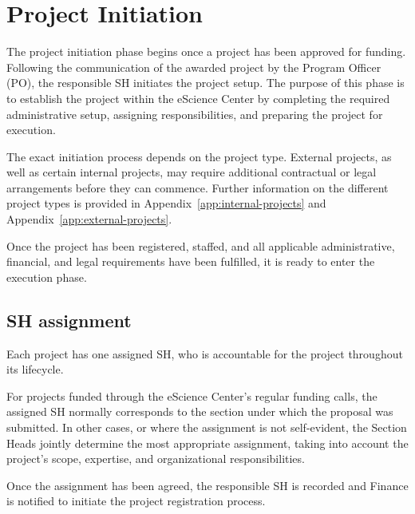 \section{Project Initiation}
\label{sec:init}
The project initiation phase begins once a project has been approved for funding. Following the communication of the 
awarded project by the Program Officer (PO), the responsible SH initiates the project setup. The purpose of this phase 
is to establish the project within the eScience Center by completing the required administrative setup, assigning 
responsibilities, and preparing the project for execution.

The exact initiation process depends on the project type. External projects, as well as certain internal projects, may
require additional contractual or legal arrangements before they can commence. Further information on the different 
project types is provided in Appendix~\ref{app:internal-projects} and Appendix~\ref{app:external-projects}.

Once the project has been registered, staffed, and all applicable administrative, financial, and legal requirements have 
been fulfilled, it is ready to enter the execution phase.

\subsection{SH assignment}
\label{sec:init:pm-assign}
Each project has one assigned SH, who is accountable for the project throughout its lifecycle.

For projects funded through the eScience Center’s regular funding calls, the assigned SH normally corresponds to the 
section under which the proposal was submitted. In other cases, or where the assignment is not self-evident, the
Section Heads jointly determine the most appropriate assignment, taking into account the project’s scope, expertise,
and organizational responsibilities.

Once the assignment has been agreed, the responsible SH is recorded and Finance is notified to initiate the project 
registration process.

